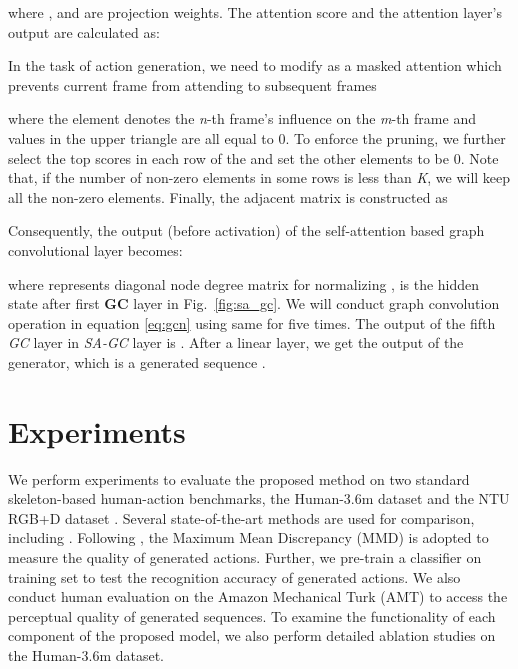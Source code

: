 \documentclass[runningheads]{llncs}
\begin{document}
where ,  and  are projection weights. The attention score  and the attention layer's output  are calculated as:




In the task of action generation, we need to modify  as a masked attention  which prevents current frame from attending to subsequent frames

where the element  denotes the {\it n}-th frame's influence on the {\it m}-th frame and values in the upper triangle are all equal to 0.
To enforce the pruning, we further select the top  scores in each row of the  and set the other elements to be 0. 
Note that, if the number of non-zero elements in some rows is less than {\it K}, we will keep all the non-zero elements. Finally, the adjacent matrix is constructed as

Consequently, the output (before activation) of the self-attention based graph convolutional layer becomes:

where  represents diagonal node degree matrix for normalizing ,  is the hidden state after first \textbf{GC}
layer in Fig.~\ref{fig:sa_gc}. 
We will conduct graph convolution operation in equation \ref{eq:gcn} using same  for five times. The output of the fifth {\it GC} layer in {\it SA-GC} layer is . After a linear layer, we get the output of the generator, which is a generated sequence . 
   




\section{Experiments}
We perform experiments to evaluate the proposed method on two standard skeleton-based human-action benchmarks, the Human-3.6m dataset \cite{ionescu2013human3} and the NTU RGB+D dataset \cite{shahroudy2016ntu}. Several state-of-the-art methods are used for comparison, including \cite{wichers2018hierarchical,habibie2017recurrent,cai2018deep,wang2019learning}. Following \cite{wang2019learning}, the Maximum Mean Discrepancy (MMD) \cite{gretton2012kernel} is adopted to measure the quality of generated actions. Further, we pre-train a classifier on training set to test the recognition accuracy of generated actions.
We also conduct human evaluation on the Amazon Mechanical Turk (AMT) to access the perceptual quality of generated sequences. To examine the functionality of each component of the proposed model, we also perform detailed ablation studies on the Human-3.6m dataset.
\end{document}
